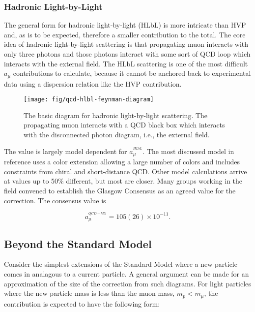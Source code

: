 \subsubsection{Hadronic Light-by-Light}

The general form for hadronic light-by-light (HLbL) is more intricate than HVP and, as is to be expected, therefore a smaller contribution to the total.  The core idea of hadronic light-by-light scattering is that propagating muon interacts with only three photons and those photons interact with some sort of QCD loop which interacts with the external field.  The HLbL scattering is one of the most difficult $a_\mu$ contributions to calculate, because it cannot be anchored back to experimental data using a dispersion relation like the HVP contribution\cite{the-muon-g-2}.

\begin{figure}
\label{fig:qcd-hlbl-feynman-diagram}
\centering
\texttt{[image: fig/qcd-hlbl-feynman-diagram]}
\caption{The basic diagram for hadronic light-by-light scattering.  The propagating muon interacts with a QCD black box which interacts with the disconnected photon diagram, i.e., the external field.}
\end{figure}

The value is largely model dependent for $a_\mu^{^{HLbL}}$.  The most discussed model in reference\cite{amm-of-muon} uses a color extension allowing a large number of colors and includes constraints from chiral and short-distance QCD.  Other model calculations arrive at values up to 50\% different, but most are closer.  Many groups working in the field convened to establish the Glasgow Consensus as an agreed value for the correction\cite{e989-tdr}.  The consensus value is

\begin{equation}
\label{eqn:qcd-hlbl-total}
a_\mu^{^{QCD-hlbl}} = 105(26) \times 10^{-11}.
\end{equation}

\subsection{Beyond the Standard Model}

Consider the simplest extensions of the Standard Model where a new particle comes in analagous to a current particle.  A general argument can be made for an approximation of the size of the correction from such diagrams\cite{the-muon-g-2}.  For light particles where the new particle mass is less than the muon mass, $m_p < m_\mu$, the contribution is expected to have the following form:

